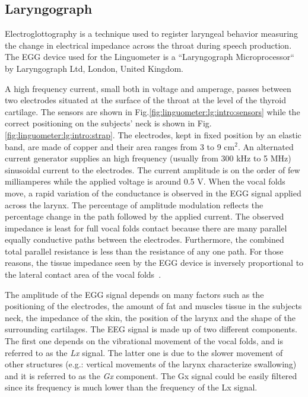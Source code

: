 \subsection{Laryngograph}
\label{ch:linguometer:instrumentation:lg}
Electroglottography is a technique used to register laryngeal behavior measuring
the change in electrical impedance across the throat during speech production.
The EGG device used for the Linguometer is a ``Laryngograph Microprocessor`` by
Laryngograph Ltd, London, United Kingdom. 


A high frequency current, small both in voltage and amperage, passes between
two electrodes situated at the surface of the throat at the level of the 
thyroid cartilage. The sensors are shown in 
Fig.\ref{fig:linguometer:lg:intro:sensors} while the correct positioning on
the subjects' neck is shown in Fig.\ref{fig:linguometer:lg:intro:strap}.
The electrodes, kept in fixed position by an elastic band, are made of copper
and their area ranges from 3 to 9 cm$^{2}$.
An alternated current generator supplies an high frequency (usually from 300 kHz
to 5 MHz) sinusoidal current to the electrodes. The current amplitude is on the
order of few milliamperes while the applied voltage is around 0.5 V.
When the vocal folds move, a rapid variation of the conductance is observed in
the EGG signal applied across the larynx.
The percentage of amplitude modulation reflects the percentage change in the
path followed by the applied current. 
The observed impedance is least for full vocal folds contact because there are 
many parallel equally conductive paths between the electrodes.
Furthermore, the combined total parallel resistance is less than the resistance
of any one path. 
For those reasons, the tissue impedance seen by the EGG device is inversely
proportional to the lateral contact area of the vocal 
folds~\citep{childers.krishnamurthy:1985}.


The amplitude of the EGG signal depends on many factors such as the
positioning of the electrodes, the amount of fat and muscles tissue in the 
subjects neck, the impedance of the skin, the position of the 
larynx and the shape of the surrounding cartilages.
The EEG signal is made up of two different components. The first one depends on
the vibrational movement of the vocal folds, and is referred to as the 
\emph{Lx} signal. 
The latter one is due to the slower movement of other structures (e.g.: vertical
movements of the larynx characterize swallowing) and it is referred to as the
\emph{Gx} component. The Gx signal could be easily filtered since its frequency
is much lower than the frequency of the Lx signal.

